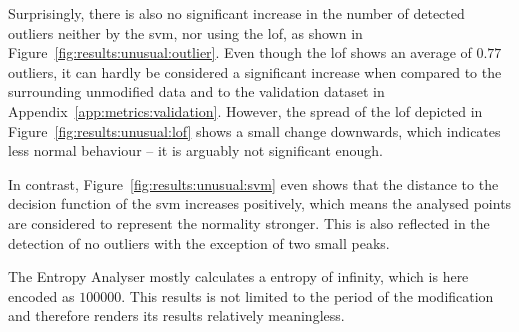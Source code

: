 Surprisingly, there is also no significant increase in the number of detected outliers neither by the \gls{svm}, nor using the \gls{lof}, as shown in Figure~\ref{fig:results:unusual:outlier}.
Even though the \gls{lof} shows an average of $0.77$ outliers, it can hardly be considered a significant increase when compared to the surrounding unmodified data and to the validation dataset in Appendix~\ref{app:metrics:validation}.
However, the spread of the \gls{lof} depicted in Figure~\ref{fig:results:unusual:lof} shows a small change downwards, which indicates less normal behaviour -- it is arguably not significant enough.

In contrast, Figure~\ref{fig:results:unusual:svm} even shows that the distance to the decision function of the \gls{svm} increases positively, which means the analysed points are considered to represent the normality stronger. This is also reflected in the detection of no outliers with the exception of two small peaks.

The Entropy Analyser mostly calculates a entropy of infinity, which is here encoded as $100000$. This results is not limited to the period of the modification and therefore renders its results relatively meaningless.


